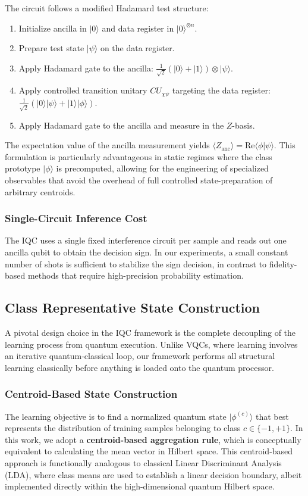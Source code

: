 \documentclass[conference]{IEEEtran}
\begin{document}
The circuit follows a modified Hadamard test structure:
\begin{enumerate}
    \item Initialize ancilla in $|0\rangle$ and data register in $|0\rangle^{\otimes n}$.
    \item Prepare test state $|\psi\rangle$ on the data register.
    \item Apply Hadamard gate to the ancilla: $\frac{1}{\sqrt{2}}(|0\rangle+|1\rangle) \otimes |\psi\rangle$.
    \item Apply controlled transition unitary $CU_{\chi\psi}$ targeting the data register: $\frac{1}{\sqrt{2}}(|0\rangle |\psi\rangle + |1\rangle |\phi\rangle)$.
    \item Apply Hadamard gate to the ancilla and measure in the $Z$-basis.
\end{enumerate}
The expectation value of the ancilla measurement yields $\langle Z_{\text{anc}} \rangle = \mathrm{Re}\langle \phi | \psi \rangle$. This formulation is particularly advantageous in static regimes where the class prototype $|\phi\rangle$ is precomputed, allowing for the engineering of specialized observables that avoid the overhead of full controlled state-preparation of arbitrary centroids.

\subsubsection{Single-Circuit Inference Cost}
The IQC uses a single fixed interference circuit per sample and reads out one ancilla qubit to obtain the decision sign. In our experiments, a small constant number of shots is sufficient to stabilize the sign decision, in contrast to fidelity-based methods that require high-precision probability estimation.

\subsection{Class Representative State Construction}
\label{sec:centroids}
A pivotal design choice in the IQC framework is the complete decoupling of the learning process from quantum execution. Unlike VQCs, where learning involves an iterative quantum-classical loop, our framework performs all structural learning classically before anything is loaded onto the quantum processor.

\subsubsection{Centroid-Based State Construction}
The learning objective is to find a normalized quantum state $|\phi^{(c)}\rangle$ that best represents the distribution of training samples belonging to class $c \in \{-1, +1\}$. In this work, we adopt a \textbf{centroid-based aggregation rule}, which is conceptually equivalent to calculating the mean vector in Hilbert space. This centroid-based approach is functionally analogous to classical Linear Discriminant Analysis (LDA), where class means are used to establish a linear decision boundary, albeit implemented directly within the high-dimensional quantum Hilbert space.
\end{document}
